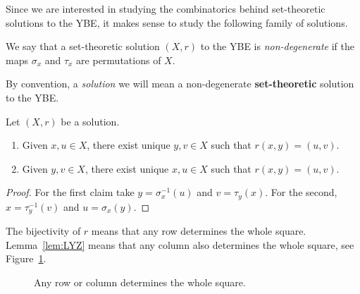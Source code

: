 Since we are interested in studying the combinatorics behind set-theoretic solutions to the YBE,
it makes sense to study the following family of solutions. 

\begin{definition}
We say that a set-theoretic solution $(X,r)$ to the YBE 
is \emph{non-degenerate} if the maps $\sigma_x$ and $\tau_x$ are 
permutations of $X$. 
\end{definition}

By convention, a \emph{solution} we will mean a non-degenerate {\bf set-theoretic} solution to the YBE.

\begin{lemma}
\label{lem:LYZ}
Let $(X,r)$ be a solution. 
\begin{enumerate}
    \item Given $x,u\in X$, there exist unique $y,v\in X$ such that $r(x,y)=(u,v)$. 
    \item Given $y,v\in X$, there exist unique $x,u\in X$ such that $r(x,y)=(u,v)$. 
\end{enumerate}
\end{lemma}

\begin{proof}
    For the first claim take $y=\sigma_x^{-1}(u)$ and $v=\tau_y(x)$. 
    For the second, $x=\tau_y^{-1}(v)$ and $u=\sigma_x(y)$. 
\end{proof}

The bijectivity of $r$ means that any row determines the whole square. Lemma~\ref{lem:LYZ}
means that any column also determines the whole square, see Figure~\ref{fig:braid}.

\begin{figure}
\centering
{}
\caption{Any row or column determines the whole square.}
\label{fig:braid}
\end{figure}

